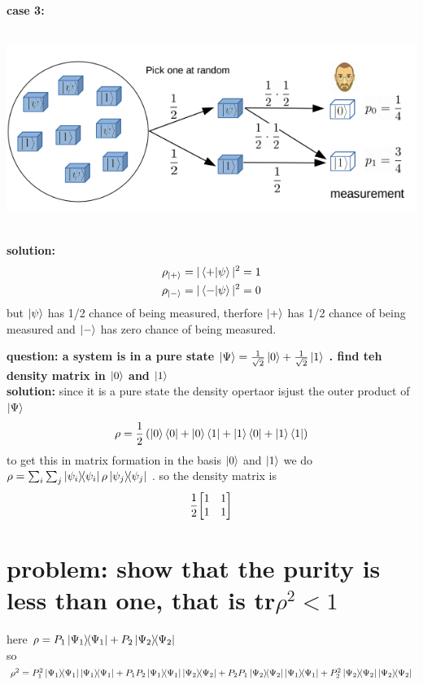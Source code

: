 \documentclass{article}
\newcommand{\nm}{\begin{equation}}
\newcommand{\enm}{\end{equation}}
\newcommand{\lp}{\left(}
\newcommand{\rp}{\right)}
\begin{document}
\textbf{case 3:}\\
\\
\centerline{ \includegraphics[scale=.5]{images-for-density-operator/case3.png}}\\
\textbf{solution:}\\

	
	\begin{align*}
	\rho_{\ket{+}}&=|\bra{+}\ket{\psi}|^2=1 \\
	\rho_{\ket{-}}&=|\bra{-}\ket{\psi}|^2=0 \\
	\end{align*}
but $\ket{\psi}$ has 1/2 chance of being measured, therfore $\ket{+}$ has 1/2 chance of being measured and $\ket{-}$ has zero chance of being measured.
\newpage

\textbf{question: a system is in a pure state $\ket{\Psi}=\frac{1}{\sqrt{2}}\ket{0}+\frac{1}{\sqrt{2}}\ket{1}$ . find teh density matrix in $\ket{0}$ and $\ket{1}$} \\
\textbf{solution:}
since it is a pure state the density opertaor isjust the outer product of $\ket{\Psi}$
\nm
\rho = \frac{1}{2}\lp \ket{0}\bra{0}+\ket{0}\bra{1}+\ket{1}\bra{0}+\ket{1}\bra{1}\rp
\enm
to get this in matrix formation in the basis $\ket{0}$ and $\ket{1}$ we do $\rho=\sum_i\sum_j\op{\psi_i}{\psi_i}\rho\op{\psi_j}{\psi_j}$ . so the density matrix is
\nm
\frac{1}{2}\mqty[1 & 1 \\ 1 & 1 ]
\enm


\section{problem: show that the purity is less than one, that is tr$\rho^2 < 1$}
here $ \rho=P_1\op{\Psi_1}{\Psi_1}+P_2\op{\Psi_2}{\Psi_2}$\\
so $\rho^2=P_1^2\op{\Psi_1}{\Psi_1}\op{\Psi_1}{\Psi_1}+P_1P_2\op{\Psi_1}{\Psi_1}\op{\Psi_2}{\Psi_2}+P_2P_1\op{\Psi_2}{\Psi_2}\op{\Psi_1}{\Psi_1}+P_2^2\op{\Psi_2}{\Psi_2}\op{\Psi_2}{\Psi_2}$
\end{document}
